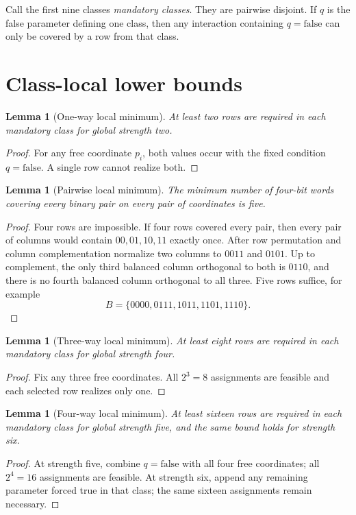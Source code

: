 \documentclass[11pt]{article}
\newtheorem{lemma}[theorem]{Lemma}
\begin{document}
Call the first nine classes \emph{mandatory classes}. They are pairwise
disjoint. If $q$ is the false parameter defining one class, then any
interaction containing $q=\mathrm{false}$ can only be covered by a row from
that class.

\section{Class-local lower bounds}
\begin{lemma}[One-way local minimum]\label{lem:one}
At least two rows are required in each mandatory class for global strength two.
\end{lemma}
\begin{proof}
For any free coordinate $p_i$, both values occur with the fixed condition
$q=\mathrm{false}$. A single row cannot realize both.
\end{proof}

\begin{lemma}[Pairwise local minimum]\label{lem:pair}
The minimum number of four-bit words covering every binary pair on every pair
of coordinates is five.
\end{lemma}
\begin{proof}
Four rows are impossible. If four rows covered every pair, then every pair of
columns would contain $00,01,10,11$ exactly once. After row permutation and
column complementation normalize two columns to $0011$ and $0101$. Up to
complement, the only third balanced column orthogonal to both is $0110$, and
there is no fourth balanced column orthogonal to all three. Five rows suffice,
for example
\[
B=\{0000,0111,1011,1101,1110\}.
\]
\end{proof}

\begin{lemma}[Three-way local minimum]\label{lem:three}
At least eight rows are required in each mandatory class for global strength four.
\end{lemma}
\begin{proof}
Fix any three free coordinates. All $2^3=8$ assignments are feasible and each
selected row realizes only one.
\end{proof}

\begin{lemma}[Four-way local minimum]\label{lem:four}
At least sixteen rows are required in each mandatory class for global strength
five, and the same bound holds for strength six.
\end{lemma}
\begin{proof}
At strength five, combine $q=\mathrm{false}$ with all four free coordinates;
all $2^4=16$ assignments are feasible. At strength six, append any remaining
parameter forced true in that class; the same sixteen assignments remain
necessary.
\end{proof}
\end{document}
